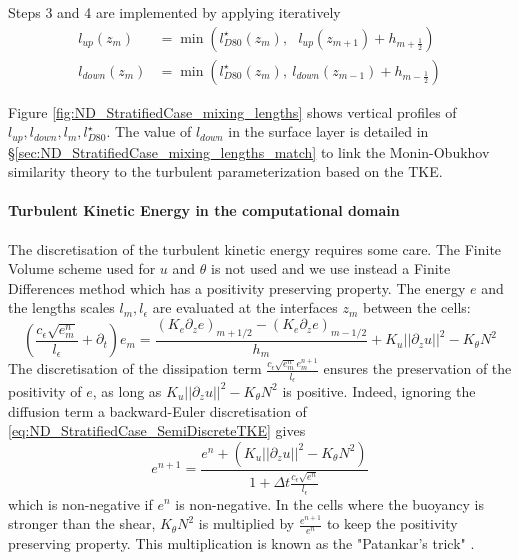 Steps 3 and 4 are implemented by applying iteratively
\begin{equation}
	\begin{aligned}
		l_{up}(z_m) &= \min\left(l^\star_{D80}(z_m),~~~
		l_{up}(z_{m+1}) + h_{m+\frac{1}{2}}\right) \\
		l_{down}(z_m) &= \min\left(l^\star_{D80}(z_m),~
		l_{down}(z_{m-1}) + h_{m-\frac{1}{2}}\right)
	\end{aligned}
\end{equation}

Figure \ref{fig:ND_StratifiedCase_mixing_lengths} shows vertical
profiles of $l_{up}, l_{down}, l_m, l_{D80}^\star$. The value of
$l_{down}$ in the surface layer is detailed in
\S \ref{sec:ND_StratifiedCase_mixing_lengths_match} to link
the Monin-Obukhov similarity theory to the turbulent
parameterization based on the TKE.
%
\paragraph{Turbulent Kinetic Energy in the computational domain}
The discretisation of the turbulent kinetic energy
requires some care. The Finite Volume scheme used for
$u$ and $\theta$ is not used and we use instead a Finite Differences
method which has a positivity preserving property.
The energy $e$ and the lengths scales
$l_m, l_\epsilon$ are evaluated at the interfaces
$z_m$ between the cells:
\begin{equation}
\label{eq:ND_StratifiedCase_SemiDiscreteTKE}
    \left(
    \frac{c_\epsilon \sqrt{e^n_m}}{l_\epsilon}
    + \partial_t
    \right) e_m
	=\frac{(K_{e} \partial_z e)_{m+1/2} -
	(K_{e} \partial_z e)_{m-1/2}}{h_{m}}
    + K_u ||\partial_z u||^2
    - K_\theta N^2
\end{equation}
The discretisation of the dissipation term
$\frac{c_\epsilon \sqrt{e_m^n}e_m^{n+1}}{l_\epsilon}$
ensures the preservation
of the positivity of $e$, as long as
$K_u ||\partial_z u||^2 - K_\theta N^2$ is positive.
Indeed, ignoring the diffusion term a backward-Euler
discretisation of \eqref{eq:ND_StratifiedCase_SemiDiscreteTKE}
gives
\begin{equation}
	e^{n+1} = \frac{e^n +
	\left(K_u ||\partial_z u||^2 - K_\theta N^2\right)}
	{1 + \Delta t \frac{c_\epsilon \sqrt{e^n}}{l_\epsilon}}
\end{equation}
which is non-negative if $e^n$ is non-negative.
In the cells where the buoyancy is stronger than the shear,
$K_\theta N^2$ is multiplied by
$\frac{e^{n+1}}{e^n}$ to keep the positivity preserving property.
This multiplication is known as the "Patankar's trick"
\citep{lemarie_simplified_2021}.
%
